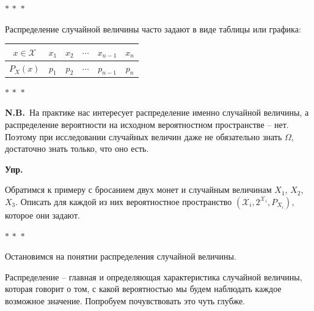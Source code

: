 \documentclass[a4paper,12pt]{article}
\newcommand{\threestars}{\begin{center}$ {\ast}\,{\ast}\,{\ast} $\end{center}}
\newcounter{z-counter}
\newcounter{th-counter}
\newcounter{col-counter}
\newcommand{\NB}[1]{%
  \par\medskip
  \noindent\textcolor{notecolor}{\textbf{N.B.}~#1}%
  \par\medskip
}
\newenvironment{exercise}{%
  \par\noindent\color{blue!70!black}\textbf{Упр.}%
}{\par}
\begin{document}
\threestars

Распределение случайной величины часто задают в виде таблицы или графика:
\begin{center}
\begin{tabular}{|c|c|c|c|c|c|}
\hline
$x \in \mathcal{X}$ & $x_1$ & $x_2$ & $\cdots$ & $x_{n-1}$ & $x_n$ \\
\hline
$P_X(x)$  & $p_1$ & $p_2$ & $\cdots$ & $p_{n-1}$ & $p_n$ \\
\hline
\end{tabular}
\end{center}

\begin{center}
\end{center}

\threestars

\NB{На практике нас интересует распределение именно случайной величины, а распределение вероятности на исходном вероятностном пространстве -- нет. Поэтому при исследовании случайных величин даже не обязательно знать $\Omega$, достаточно знать только, что оно есть.}

\begin{exercise}
    Обратимся к примеру с бросанием двух монет и случайным величинам $X_1$, $X_2$, $X_3$. Описать для каждой из них вероятностное пространство $(\mathcal{X}_i, 2^{\mathcal{X}_i}, P_{X_i})$, которое они задают.
\end{exercise}

\threestars

Остановимся на понятии распределения случайной величины.

Распределение -- главная и определяющая характеристика случайной величины, которая говорит о том, с какой вероятностью мы будем наблюдать каждое возможное значение. Попробуем почувствовать это чуть глубже.
\end{document}
